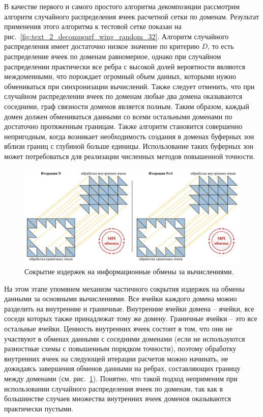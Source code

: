 В качестве первого и самого простого алгоритма декомпозиции рассмотрим алгоритм случайного распределения ячеек расчетной сетки по доменам.
Результат применения этого алгоритма к тестовой сетке показан на рис.~\ref{fig:text_2_decompsurf_wing_random_32}.
Алгоритм случайного распределения имеет достаточно низкое значение по критерию $D$, то есть распределение ячеек по доменам равномерное, однако при случайном распределении практически все ребра с высокой долей вероятности являются междоменными, что порождает огромный объем данных, которыми нужно обмениваться при синхронизации вычислений.
Также следует отменить, что при случайном распределении ячеек по доменам любые два домена оказываются соседними, граф связности доменов является полным.
Таким образом, каждый домен должен обмениваться данными со всеми остальными доменами по достаточно протяженным границам.
Также алгоритм становится совершенно непригодным, когда возникает необходимость создания в доменах буферных зон вблизи границ с глубиной больше единицы.
Использование таких буферных зон может потребоваться для реализации численных методов повышенной точности.

\begin{figure}[ht]
	\centering
	\includegraphics[width=1.0\textwidth]{./pics/text_2_decompsurf/mpi_border_inner.pdf}
	\caption{Сокрытие издержек на информационные обмены за вычислениями.}
	\label{fig:text_2_decompsurf_wing_border_inner}
\end{figure}

На этом этапе упомянем механизм частичного сокрытия издержек на обмены данными за основными вычислениями.
Все ячейки каждого домена можно разделить на внутренние и граничные.
Внутренние ячейки домена -- ячейки, все соседи которых также принадлежат тому же домену.
Граничные ячейки -- это все остальные ячейки.
Ценность внутренних ячеек состоит в том, что они не участвуют в обменах данными с соседними доменами (если не используются разностные схемы с повышенным порядком точности), поэтому обработку внутренних ячеек на следующей итерации расчетов можно начинать, не дожидаясь завершения обменов данными на ребрах, составляющих границу между доменами (см. рис.~\ref{fig:text_2_decompsurf_wing_border_inner}).
Понятно, что такой подход неприменим при использовании случайного распределения ячеек по доменам, так как в большинстве случаев множества внутренних ячеек доменов оказываются практически пустыми.


